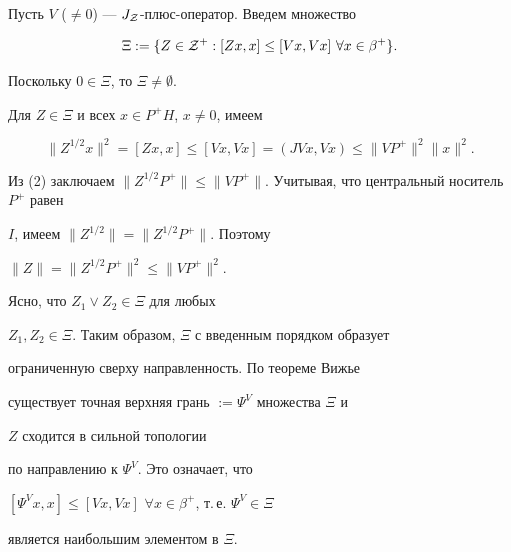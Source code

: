 Пусть $V$ ($\ne0$) --- $J_{\cal Z}$-плюс-оператор. Введем множество


$$


\Xi: =\{Z\in {\cal Z}^{+}: [Zx,x]\leq [Vx,Vx]


\ \forall x\in \beta^{+}\}.


$$


Поскольку $0\in\Xi$, то $\Xi\ne\emptyset$. 


Для $Z\in \Xi$ и всех $x\in P^{+}H$, $x\ne 0$, имеем


\begin{equation}


\| Z^{1/2}x\|^{2}=[Zx,x]\leq [Vx,Vx]


=(JVx, Vx)\leq\| VP^{+}\|^{2}\| x\|^{2}.


\end{equation}


Из (2) заключаем $\| Z^{1/2}P^{+}\|\leq 


\| VP^{+}\|$. Учитывая, что центральный носитель $P^{+}$ равен 


$I$, имеем $\| Z^{1/2}\| =\| Z^{1/2}P^{+}\|$. Поэтому


$\| Z\| = \| Z^{1/2}P^{+}\|^{2}\leq\| VP^{+}\|^{2}$. 


Ясно, что $Z_{1}\vee Z_{2}\in \Xi$ для любых


$Z_{1}, Z_{2}\in\Xi$. Таким образом, $\Xi$ с введенным порядком образует


ограниченную сверху направленность. По теореме Вижье 


существует точная верхняя грань $:=\Psi^{V}$ множества $\Xi$ и 


$Z$ сходится в сильной топологии


по направлению к $\Psi^{V}$. Это означает, что


$[\Psi^{V}x,x]\leq [Vx,Vx]$ $\forall x\in\beta^{+}$, т.\,е. $\Psi^{V}\in \Xi$ 


является наибольшим элементом в $\Xi$.






